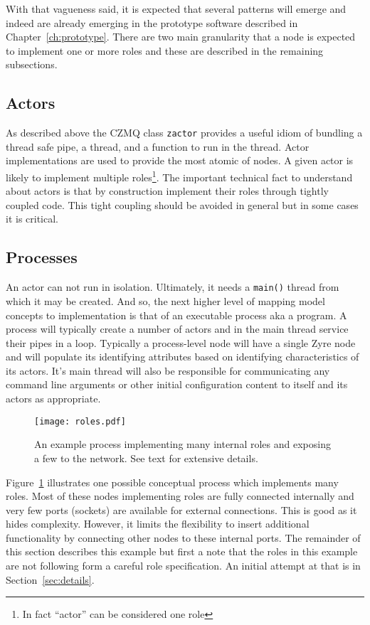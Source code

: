 \documentclass[letterpaper,oneside]{memoir}
\def\zactor{\texttt{zactor}\xspace}
\def\czmq{CZMQ\xspace}
\begin{document}
With that vagueness said, it is expected that several patterns will emerge and indeed are already emerging in the prototype software described in Chapter~\ref{ch:prototype}. 
There are two main granularity that a node is expected to implement one or more roles and these are described in the remaining subsections.

\subsection{Actors}

As described above the \czmq class \zactor provides a useful idiom of bundling a thread safe pipe, a thread, and a function to run in the thread. 
Actor implementations are used to provide the most atomic of nodes.
A given actor is likely to implement multiple roles\footnote{In fact ``actor'' can be considered one role}. 
The important technical fact to understand about actors is that by construction implement their roles through tightly coupled code. 
This tight coupling should be avoided in general but in some cases it is critical.
\subsection{Processes}

An actor can not run in isolation. 
Ultimately, it needs a \texttt{main()} thread from which it may be created.
And so, the next higher level of mapping model concepts to implementation is that of an executable process aka a program. 
A process will typically create a number of actors and in the main thread service their pipes in a loop. 
Typically a process-level node will have a single Zyre node and will populate its identifying attributes based on identifying characteristics of its actors. 
It's main thread will also be responsible for communicating any command line arguments or other initial configuration content to itself and its actors as appropriate.

\begin{figure}[htbp]
  \centering
  \texttt{[image: roles.pdf]}
  \caption{An example process implementing many internal roles and exposing a few to the network.  See text for extensive details.}
  \label{fig:fenode}
\end{figure}

Figure~\ref{fig:fenode} illustrates one possible conceptual process which implements many roles. 
Most of these nodes implementing roles are fully connected internally and very few ports (sockets) are available for external connections. 
This is good as it hides complexity. 
However, it limits the flexibility to insert additional functionality by connecting other nodes to these internal ports. 
The remainder of this section describes this example but first a note that the roles in this example are not following form a careful role specification.  An initial attempt at that is in Section~\ref{sec:details}.
\end{document}
